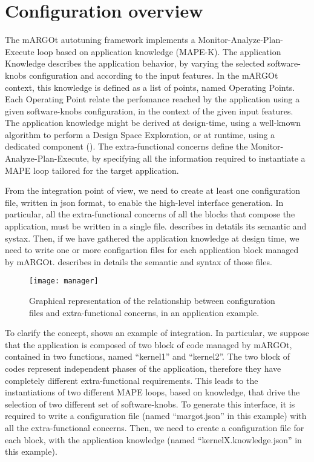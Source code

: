 \section{Configuration overview}
The mARGOt autotuning framework implements a Monitor-Analyze-Plan-Execute loop based on application knowledge (MAPE-K).
The application Knowledge describes the application behavior, by varying the selected software-knobs configuration and according to the input features.
In the mARGOt context, this knowledge is defined as a list of points, named Operating Points.
Each Operating Point relate the perfomance reached by the application using a given software-knobs configuration, in the context of the given input features.
The application knowledge might be derived at design-time, using a well-known algorithm to perform a Design Space Exploration, or at runtime, using a dedicated component ().
The extra-functional concerns define the Monitor-Analyze-Plan-Execute, by specifying all the information required to instantiate a MAPE loop tailored for the target application.


From the integration point of view, we need to create at least one configuration file, written in json format, to enable the high-level interface generation.
In particular, all the extra-functional concerns of all the blocks that compose the application, must be written in a single file.
 describes in detatils its semantic and systax.
Then, if we have gathered the application knowledge at design time, we need to write one or more configartion files for each application block managed by mARGOt.
 describes in details the semantic and syntax of those files.

\begin{figure}
\centering
\texttt{[image: manager]}
\caption{Graphical representation of the relationship between configuration files and extra-functional concerns, in an application example.}
\label{fig:manager}
\end{figure}


To clarify the concept,  shows an example of integration.
In particular, we suppose that the application is composed of two block of code managed by mARGOt, contained in two functions, named ``kernel1'' and ``kernel2''.
The two block of codes represent independent phases of the application, therefore they have completely different extra-functional requirements.
This leads to the instantiations of two different MAPE loops, based on knowledge, that drive the selection of two different set of software-knobs.
To generate this interface, it is required to write a configuration file (named ``margot.json'' in this example) with all the extra-functional concerns.
Then, we need to create a configuration file for each block, with the application knowledge (named ``kernelX.knowledge.json'' in this example).
